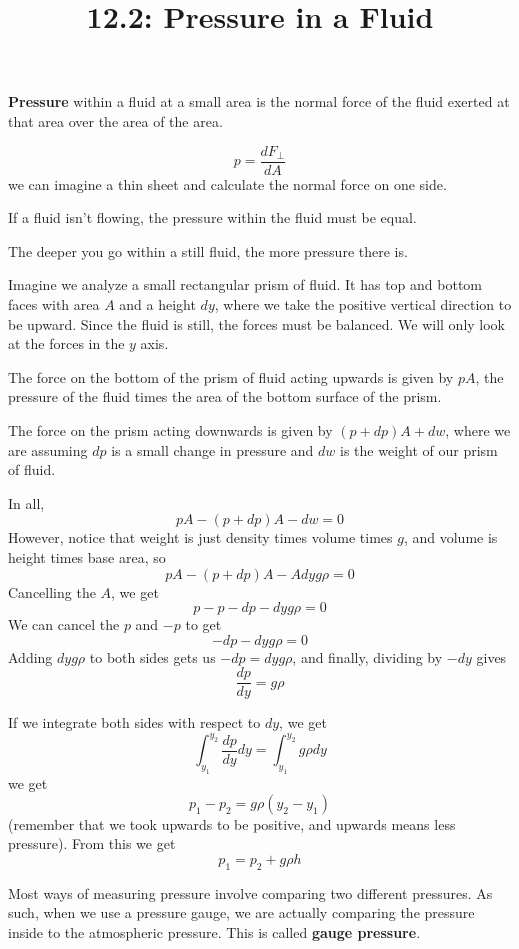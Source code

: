 \documentclass{article}
\title{12.2: Pressure in a Fluid}
\begin{document}
\maketitle

\begin{definition}[Pressure]
\textbf{Pressure} within a fluid at a small area is the normal force of the fluid exerted at that area over the area of the area.

$$p = \frac{dF_\perp}{dA}$$we can imagine a thin sheet and calculate the normal force on one side. 
\end{definition}

If a fluid isn't flowing, the pressure within the fluid must be equal. 

\begin{theorem}
The deeper you go within a still fluid, the more pressure there is.
\end{theorem}

\begin{customproof}
Imagine we analyze a small rectangular prism of fluid. It has top and bottom faces with area $A$ and a height $dy$, where we take the positive vertical direction to be upward. Since the fluid is still, the forces must be balanced. We will only look at the forces in the $y$ axis.

The force on the bottom of the prism of fluid acting upwards is given by $pA$, the pressure of the fluid times the area of the bottom surface of the prism.

The force on the prism acting downwards is given by $(p+dp)A + dw$, where we are assuming $dp$ is a small change in pressure and $dw$ is the weight of our prism of fluid. 

In all, $$pA - (p+dp)A - dw = 0$$However, notice that weight is just density times volume times $g$, and volume is height times base area, so $$pA - (p+dp)A - Adyg\rho = 0$$Cancelling the $A$, we get $$p - p - dp - dyg\rho = 0$$We can cancel the $p$ and $-p$ to get $$-dp -dyg\rho = 0$$Adding $dyg\rho$ to both sides gets us $-dp = dyg\rho$, and finally, dividing by $-dy$ gives $$\frac{dp}{dy} = g\rho$$
\end{customproof}

\begin{lemma}
If we integrate both sides with respect to $dy$, we get $$\int_{y_1}^{y_2} \frac{dp}{dy}dy = \int_{y_1}^{y_2} g\rho dy$$we get $$p_1 - p_2 = g\rho(y_2-y_1)$$(remember that we took upwards to be positive, and upwards means less pressure). From this we get $$p_1 = p_2 + g\rho h$$
\end{lemma}

\begin{definition}
Most ways of measuring pressure involve comparing two different pressures. As such, when we use a pressure gauge, we are actually comparing the pressure inside to the atmospheric pressure. This is called \textbf{gauge pressure}. 
\end{definition}
\end{document}

